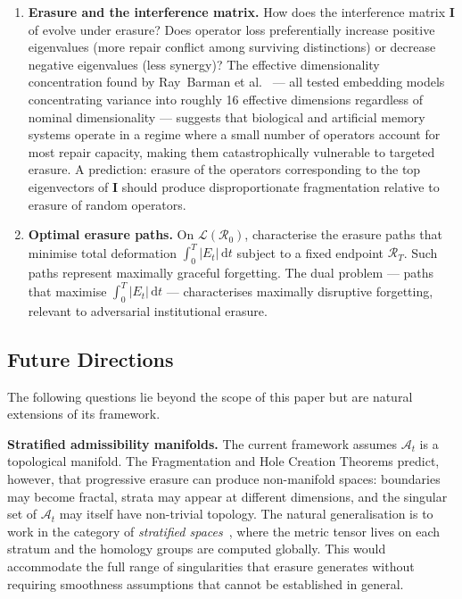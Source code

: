 \documentclass[12pt, oneside]{article}
\theoremstyle{plain}
\theoremstyle{definition}
\theoremstyle{remark}
\newcommand{\At}{\mathcal{A}_t}
\newcommand{\Rzero}{\mathcal{R}_0}
\newcommand{\Et}{E_t}
\newcommand{\IntMat}{\mathbf{I}}
\begin{document}
\begin{enumerate}
  \item \textbf{Erasure and the interference matrix.}\;
    How does the interference matrix $\IntMat$ of
    \cite{Flyxion2026a} evolve under erasure?
    Does operator loss preferentially increase positive eigenvalues
    (more repair conflict among surviving distinctions) or decrease
    negative eigenvalues (less synergy)?
    The effective dimensionality concentration found by
    Ray~Barman et al.~\cite{RayBarman2026} --- all tested embedding
    models concentrating variance into roughly 16 effective
    dimensions regardless of nominal dimensionality --- suggests
    that biological and artificial memory systems operate in a regime
    where a small number of operators account for most repair
    capacity, making them catastrophically vulnerable to targeted
    erasure.
    A prediction: erasure of the operators corresponding to the
    top eigenvectors of $\IntMat$ should produce disproportionate
    fragmentation relative to erasure of random operators.

  \item \textbf{Optimal erasure paths.}\;
    On $\mathcal{L}(\Rzero)$, characterise the erasure paths that
    minimise total deformation $\int_0^T |\Et|\, \mathrm{d}t$
    subject to a fixed endpoint $\mathcal{R}_T$.
    Such paths represent maximally graceful forgetting.
    The dual problem --- paths that maximise $\int_0^T |\Et|\,
    \mathrm{d}t$ --- characterises maximally disruptive forgetting,
    relevant to adversarial institutional erasure.

\end{enumerate}

\subsection*{Future Directions}

The following questions lie beyond the scope of this paper but
are natural extensions of its framework.

\medskip\noindent
\textbf{Stratified admissibility manifolds.}\;
The current framework assumes $\At$ is a topological manifold.
The Fragmentation and Hole Creation Theorems predict, however,
that progressive erasure can produce non-manifold spaces:
boundaries may become fractal, strata may appear at different
dimensions, and the singular set of $\At$ may itself have
non-trivial topology.
The natural generalisation is to work in the category of
\emph{stratified spaces}~\cite{Munkres2000}, where the metric
tensor lives on each stratum and the homology groups are computed
globally.
This would accommodate the full range of singularities that
erasure generates without requiring smoothness assumptions that
cannot be established in general.
\end{document}
